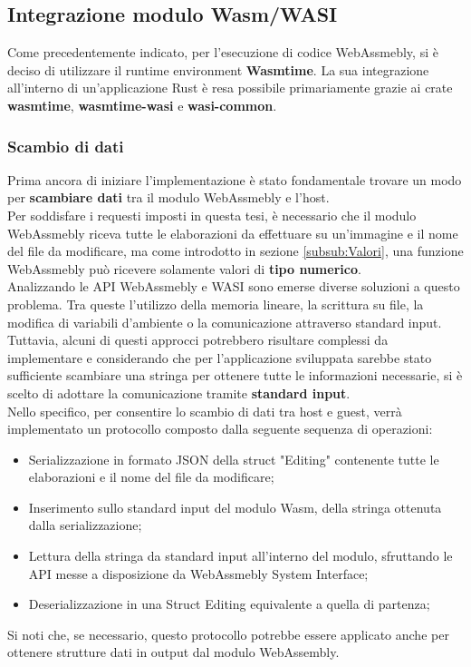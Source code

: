 \subsection{Integrazione modulo Wasm/WASI}
Come precedentemente indicato, per l'esecuzione di codice WebAssmebly, si è deciso di utilizzare il runtime environment \textbf{Wasmtime}.
La sua integrazione all'interno di un'applicazione Rust è resa possibile primariamente grazie ai crate \textbf{wasmtime}, \textbf{wasmtime-wasi} e \textbf{wasi-common}.
\subsubsection{Scambio di dati}
Prima ancora di iniziare l'implementazione è stato fondamentale trovare un modo per \textbf{scambiare dati} tra il modulo WebAssmebly e l'host.
\\Per soddisfare i requesti imposti in questa tesi, è necessario che il modulo WebAssmebly riceva tutte le elaborazioni da effettuare su un'immagine e il nome del file da modificare, ma come introdotto in sezione \ref{subsub:Valori}, una funzione WebAssmebly può ricevere solamente valori di \textbf{tipo numerico}.
\\Analizzando le API WebAssmebly e WASI sono emerse diverse soluzioni a questo problema. Tra queste l'utilizzo della memoria lineare, la scrittura su file, la modifica di variabili d'ambiente o la comunicazione attraverso standard input.
Tuttavia, alcuni di questi approcci potrebbero risultare complessi da implementare e considerando che per l'applicazione sviluppata sarebbe stato sufficiente scambiare una stringa per ottenere tutte le informazioni necessarie, si è scelto di adottare la comunicazione tramite \textbf{standard input}.
\\Nello specifico, per consentire lo scambio di dati tra host e guest, verrà implementato un protocollo composto dalla seguente sequenza di operazioni:
\begin{itemize}
    \item Serializzazione in formato JSON della struct "Editing" contenente tutte le elaborazioni  e il nome del file da modificare;
    \item Inserimento sullo standard input del modulo Wasm, della stringa ottenuta dalla serializzazione;
    \item Lettura della stringa da standard input all'interno del modulo, sfruttando le API messe a disposizione da WebAssmebly System Interface;
    \item Deserializzazione in una Struct Editing equivalente a quella di partenza;
\end{itemize}
Si noti che, se necessario, questo protocollo potrebbe essere applicato anche per ottenere strutture dati in output dal modulo WebAssembly.
